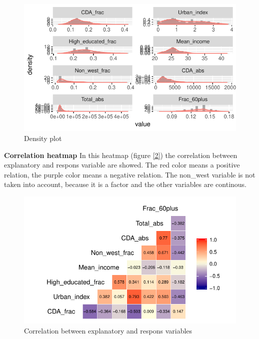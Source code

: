 \documentclass[11pt,]{article}
\begin{document}
\begin{figure}[H]

{\centering \includegraphics{Report_files/figure-latex/demographics_data-1} 

}

\caption{\label{1} Density plot}\label{fig:demographics_data}
\end{figure}

\textbf{Correlation heatmap} In this heatmap (figure \ref{2}) the
correlation between explanatory and respons variable are showed. The red
color means a positive relation, the purple color means a negative
relation. The non\_west variable is not taken into account, because it
is a factor and the other variables are continous.

\begin{figure}[H]

{\centering \includegraphics{Report_files/figure-latex/correlation_heatmap-1} 

}

\caption{\label{2}Correlation between explanatory and respons variables}\label{fig:correlation_heatmap}
\end{figure}
\end{document}
